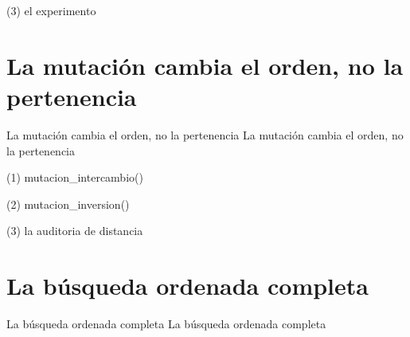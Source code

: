 \begin{frame}[fragile]{(3) el experimento}

\end{frame}


\section{La mutación cambia el orden, no la pertenencia}

\begin{frame}{La mutación cambia el orden, no la pertenencia}
La mutación cambia el orden, no la pertenencia
\end{frame}

\begin{frame}[fragile]{(1) mutacion\_intercambio()}

\end{frame}

\begin{frame}[fragile]{(2) mutacion\_inversion()}

\end{frame}

\begin{frame}[fragile]{(3) la auditoria de distancia}

\end{frame}


\section{La búsqueda ordenada completa}

\begin{frame}{La búsqueda ordenada completa}
La búsqueda ordenada completa
\end{frame}

